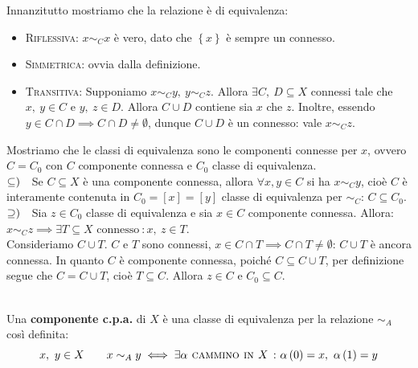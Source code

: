 \begin{demonstration}
Innanzitutto mostriamo che la relazione è di equivalenza:
\begin{itemize}
\item \textsc{Riflessiva}: $x\sim_C x$ è vero, dato che $\left\{x\right\}$ è sempre un connesso.
\item \textsc{Simmetrica}: ovvia dalla definizione.
\item \textsc{Transitiva}: Supponiamo $x\sim_C y,\ y\sim_C z$. Allora $\exists C,\ D\subseteq X$ connessi tale che $x,\ y\in C$ e $y,\ z\in D$. Allora $C\cup D$ contiene sia $x$ che $z$. Inoltre, essendo $y\in C\cap D\implies C\cap D\neq \emptyset$, dunque $C\cup D$ è un connesso: vale $x\sim_C z$.
\end{itemize}
Mostriamo che le classi di equivalenza sono le componenti connesse per $x$, ovvero $C=C_0$ con $C$ componente connessa e $C_0$ classe di equivalenza.\\
$\subseteq)\quad$Se $C\subseteq X$ è una componente connessa, allora $\forall x, y\in C$ si ha $x\sim_C y$, cioè $C$ è interamente contenuta in $C_0=[x]=[y]$ classe di equivalenza per $\sim_C$: $C\subseteq C_0$.\\
$\supseteq)\quad$Sia $z\in C_0$ classe di equivalenza e sia $x\in C$ componente connessa. Allora: $x\sim_C z\implies \exists T\subseteq X \text{ connesso}\ \colon x,\ z\in T$.\\
Consideriamo $C\cup T$. $C$ e $T$ sono connessi, $x\in C\cap T\implies C\cap T\neq \emptyset$: $C\cup T$ è ancora connessa. In quanto $C$ è componente connessa, poiché $C\subseteq C\cup T$, per definizione segue che $C=C\cup T$, cioè $T\subseteq C$. Allora $z\in C$ e $C_0\subseteq C$.
\end{demonstration}
\begin{define}[Componente c.p.a..]~{}\\
Una \textbf{componente c.p.a.} di $X$ è una classe di equivalenza per la relazione $\sim_A$ così definita:
	\begin{equation}
	x,\ y\in X\qquad x\sim_A y\iff \exists \alpha\textsc{ cammino in }X\ \colon \alpha\left(0\right)=x,\ \alpha\left(1\right)=y
\end{equation}
\vspace{-6mm}
\end{define}
